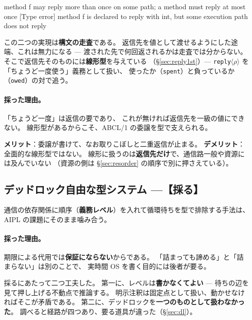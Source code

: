 \documentclass[11pt,a4paper]{ltjsarticle}
\theoremstyle{definition}
\theoremstyle{remark}
\begin{document}
\begin{term}
 method f may reply more than once on some path;
             a method must reply at most once
[Type error] method f is declared to reply with int,
             but some execution path does not reply
\end{term}

この二つの実現は\textbf{構文の走査}である。
返信先を値として渡せるようにした途端、これは無力になる ---
渡された先で何回返されるかは走査では分からない。
そこで返信先そのものには\textbf{線形型}を与えている
（\S\ref{sec:reply1st}）---
\texttt{reply}$\langle\rho\rangle$ を「ちょうど一度使う」義務として扱い、
使ったか（\texttt{spent}）と負っているか（\texttt{owed}）の対で追う。


\paragraph{採った理由。}
「ちょうど一度」は返信の要であり、
これが無ければ返信先を一級の値にできない。
線形型があるからこそ、ABCL/1 の委譲を型で支えられる。

\textbf{メリット}：委譲が書けて、なお取りこぼしと二重返信が止まる。
\textbf{デメリット}：全面的な線形型ではない。
線形に扱うのは\textbf{返信先だけ}で、通信路一般や資源には及んでいない
（資源の側は \S\ref{sec:resorder} の順序で別に押さえている）。

\subsection{デッドロック自由な型システム ---【採る】}

通信の依存関係に順序（\textbf{義務レベル}）を入れて循環待ちを型で排除する手法は、
AIPL の課題にそのまま噛み合う。

\paragraph{採った理由。}
期限による代用では\textbf{保証にならない}からである。
「詰まっても諦める」と「詰まらない」は別のことで、
実時間 OS を書く目的には後者が要る。

採るにあたって二つ工夫した。
第一に、レベルは\textbf{書かなくてよい} --- 待ちの辺を見て押し上げる不動点で推論する。
明示注釈は固定点として扱い、動かせなければそこが矛盾である。
第二に、デッドロックを\textbf{一つのものとして扱わなかった}。
調べると経路が四つあり、要る道具が違った（\S\ref{sec:dl}）。
\end{document}

